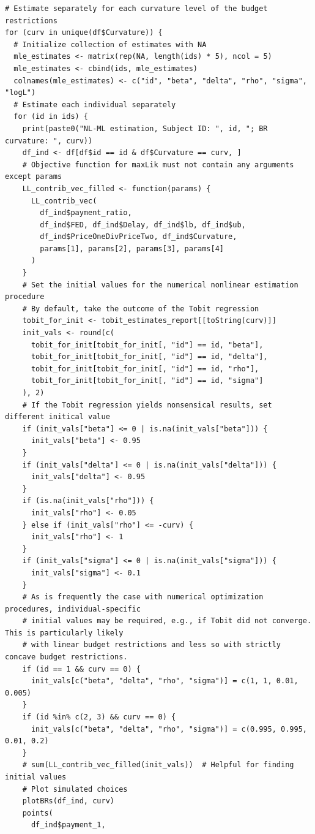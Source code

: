 \documentclass[11pt, a4paper, oneside]{article}
\theoremstyle{Plain}
\theoremstyle{Definition}
\theoremstyle{Remark}
\begin{document}
\begin{appendix}
\begin{lstlisting}
# Estimate separately for each curvature level of the budget restrictions
for (curv in unique(df$Curvature)) {
  # Initialize collection of estimates with NA
  mle_estimates <- matrix(rep(NA, length(ids) * 5), ncol = 5)
  mle_estimates <- cbind(ids, mle_estimates)
  colnames(mle_estimates) <- c("id", "beta", "delta", "rho", "sigma", "logL")
  # Estimate each individual separately
  for (id in ids) {
    print(paste0("NL-ML estimation, Subject ID: ", id, "; BR curvature: ", curv))
    df_ind <- df[df$id == id & df$Curvature == curv, ]
    # Objective function for maxLik must not contain any arguments except params
    LL_contrib_vec_filled <- function(params) {
      LL_contrib_vec(
        df_ind$payment_ratio,
        df_ind$FED, df_ind$Delay, df_ind$lb, df_ind$ub,
        df_ind$PriceOneDivPriceTwo, df_ind$Curvature,
        params[1], params[2], params[3], params[4]
      )
    }
    # Set the initial values for the numerical nonlinear estimation procedure
    # By default, take the outcome of the Tobit regression
    tobit_for_init <- tobit_estimates_report[[toString(curv)]]
    init_vals <- round(c(
      tobit_for_init[tobit_for_init[, "id"] == id, "beta"],
      tobit_for_init[tobit_for_init[, "id"] == id, "delta"],
      tobit_for_init[tobit_for_init[, "id"] == id, "rho"],
      tobit_for_init[tobit_for_init[, "id"] == id, "sigma"]
    ), 2)
    # If the Tobit regression yields nonsensical results, set different initical value
    if (init_vals["beta"] <= 0 | is.na(init_vals["beta"])) {
      init_vals["beta"] <- 0.95
    }
    if (init_vals["delta"] <= 0 | is.na(init_vals["delta"])) {
      init_vals["delta"] <- 0.95
    }
    if (is.na(init_vals["rho"])) {
      init_vals["rho"] <- 0.05
    } else if (init_vals["rho"] <= -curv) {
      init_vals["rho"] <- 1
    }
    if (init_vals["sigma"] <= 0 | is.na(init_vals["sigma"])) {
      init_vals["sigma"] <- 0.1
    }
    # As is frequently the case with numerical optimization procedures, individual-specific
    # initial values may be required, e.g., if Tobit did not converge. This is particularly likely
    # with linear budget restrictions and less so with strictly concave budget restrictions.
    if (id == 1 && curv == 0) {
      init_vals[c("beta", "delta", "rho", "sigma")] = c(1, 1, 0.01, 0.005)
    }
    if (id %in% c(2, 3) && curv == 0) {
      init_vals[c("beta", "delta", "rho", "sigma")] = c(0.995, 0.995, 0.01, 0.2)
    }
    # sum(LL_contrib_vec_filled(init_vals))  # Helpful for finding initial values
    # Plot simulated choices
    plotBRs(df_ind, curv)
    points(
      df_ind$payment_1,

\end{lstlisting}
\end{appendix}
\end{document}
